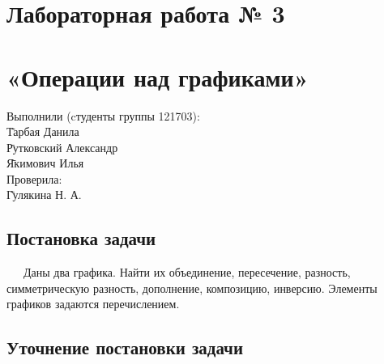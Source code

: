 \documentclass[a4paper,12pt]{extarticle}
\begin{document}
 
\hspace{0pt}
\vfill
\begin{center}
\section*{Лабораторная работа № 3}
\section*{«Операции над графиками»}
\end{center}
\vfill
\begin{tabbing}
Выполнили (cтуденты группы 121703):\\
\hspace{1em} \= Тарбая Данила\\
\hspace{1em} \= Рутковский Александр\\
\hspace{1em} \= Якимович Илья\\
Проверила:\\
\hspace{1em} \= Гулякина Н. А.\\
\end{tabbing}
\hspace{0pt}
\pagebreak
 
 
\newpage
\fancyhf{}
\begin{center}
\section*{Постановка задачи}
\end{center}
\justify\ \ \ Даны два графика. Найти их объединение, пересечение, разность, симметрическую разность, дополнение, композицию, инверсию. Элементы графиков задаются перечислением.
\begin{center}
\section*{Уточнение постановки задачи}
\end{center}
 
\end{document}
